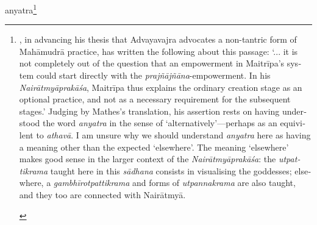 \documentclass[naipra.tex]{subfiles}
\begin{document}
\begin{sanskrit}
\pstart
anyatra\footnote{
	\begin{english}%
		\textcites[374]{mathes2014}[132]{mathes2021}, in advancing his thesis that Advayavajra advocates a non-tantric form of Mahāmudrā practice, has written the following about this passage: `... it is not completely out of the question that an empowerment in Maitrīpa's system could start directly with the \emph{prajñājñāna}-empowerment. In his \emph{Nairātmyāprakāśa}, Maitrīpa thus explains the ordinary creation stage as an optional practice, and not as a necessary requirement for the subsequent stages.' 
		Judging by Mathes's translation, his assertion rests on having understood the word \emph{anyatra} in the sense of `alternatively'—perhaps as an equivilent to \emph{athavā}.
		I am unsure why we should understand \emph{anyatra} here as having a meaning other than the expected `elsewhere'.
		The meaning `elsewhere' makes good sense in the larger context of the \emph{Nairātmyāprakāśa}: the \emph{utpattikrama} taught here in this \emph{sādhana} consists in visualising the goddesses; elsewhere, a \emph{gambhīrotpattikrama} and forms of \emph{utpannakrama} are also taught, and they too are connected with Nairātmyā.


\end{english}}
\end{sanskrit}
\end{document}

